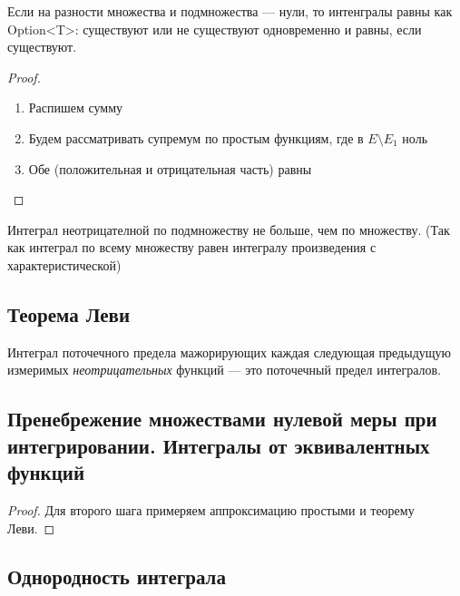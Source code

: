 \documentclass[12pt, a4paper, oneside]{memoir}
\begin{document}
\begin{theorem}
    Если на разности множества и подмножества — нули, то интенгралы равны как Option<T>: существуют или не существуют одновременно и равны, если существуют.


    \begin{proof}
        \begin{enumerate}
            \item Распишем сумму
            \item Будем рассматривать супремум по простым функциям, где в $E \setminus E_1$ ноль
            \item Обе (положительная и отрицательная часть) равны
        \end{enumerate}
    \end{proof}
\end{theorem}

\begin{corollary}
    Интеграл неотрицателной по подмножеству не больше, чем по множеству. (Так как интеграл по всему множеству равен интегралу произведения с характеристической)
\end{corollary}


\subsection{Теорема Леви}

\begin{theorem}
    Интеграл поточечного предела мажорирующих каждая следующая предыдущую измеримых \textit{неотрицательных} функций — это поточечный предел интегралов.
\end{theorem}


\subsection{Пренебрежение множествами нулевой меры при интегрировании. Интегралы от эквивалентных функций}

\begin{lemma}

    \begin{proof}
        Для второго шага примеряем аппроксимацию простыми и теорему Леви.
    \end{proof}
\end{lemma}

\subsection{Однородность интеграла}
\end{document}
